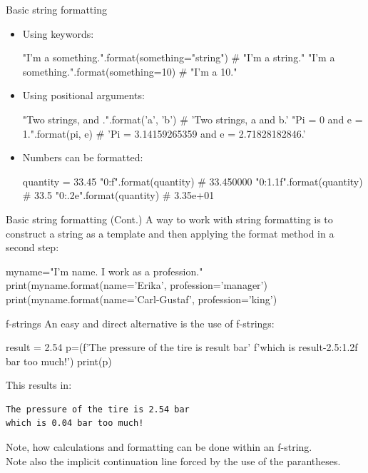\documentclass[hyperref={pdfpagelabels=false},table, handout]{beamer}
\begin{document}
\begin{frame}[fragile]{Basic string formatting}
\begin{itemize}
\item Using keywords:
\begin{python}
"I'm a {something}.".format(something="string")
# "I'm a string."
"I'm a {something}.".format(something=10)
# "I'm a 10."
\end{python}

\item Using positional arguments:
\begin{python}
"Two strings, {} and {}.".format('a', 'b')
# 'Two strings, a and b.'
"Pi = {0} and e = {1}.".format(pi, e)
# 'Pi = 3.14159265359 and e = 2.71828182846.'
\end{python}

\item Numbers can be formatted:
\begin{python}
quantity = 33.45
"{0:f}".format(quantity)    # 33.450000
"{0:1.1f}".format(quantity) # 33.5
"{0:.2e}".format(quantity)  # 3.35e+01
\end{python}
\end{itemize}

\end{frame}
\begin{frame}[fragile]{Basic string formatting \hfill (Cont.)}
A way to work with string formatting is to construct a string
as a template and then applying the format method in a second step:
\vfill
\begin{python}
myname="I'm {name}. I work as a {profession}."
print(myname.format(name='Erika', profession='manager')
print(myname.format(name='Carl-Gustaf', profession='king')
\end{python}
\vfill

\end{frame}
\begin{frame}[fragile]{f-strings}
An easy and direct alternative is the use of f-strings:
\vfill
\begin{python}
result = 2.54
p=(f'The pressure of the tire is {result} bar\n'
   f'which is {result-2.5:1.2f} bar too much!')
print(p)
\end{python}
\vfill
This results in:
\begin{verbatim}
The pressure of the tire is 2.54 bar
which is 0.04 bar too much!
\end{verbatim}
{\tiny Note, how calculations and formatting can be done within an f-string.\\ Note also the implicit continuation line forced by the use of the parantheses.}
\end{frame}
\end{document}
